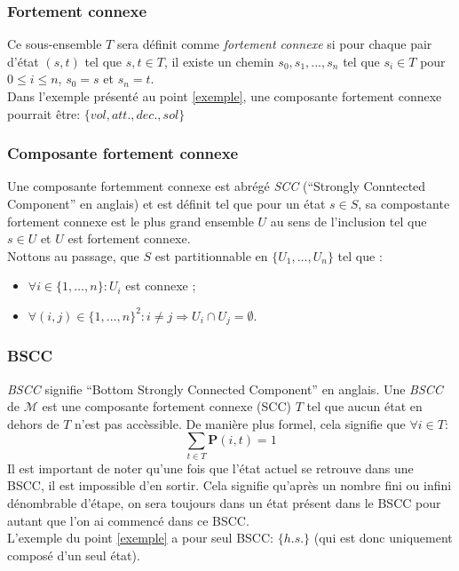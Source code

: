 \documentclass[letterpaper]{article}
\begin{document}
    \subsubsection{Fortement connexe}
      Ce sous-ensemble $T$ sera définit comme \textit{fortement connexe} si
      pour chaque pair d'état $(s, t)$ tel que $s, t \in T$, il existe un
      chemin $s_0, s_1, ..., s_n$ tel que $s_i \in T$ pour $0 \leq i \leq n$, 
      $s_0 = s$ et $s_n = t$.\\
      Dans l'exemple présenté au point \ref{exemple}, une composante fortement
      connexe pourrait être: $\{vol, att., dec., sol\}$
      
    \subsubsection{Composante fortement connexe}
      Une composante fortemment connexe est abrégé \textit{SCC} (``Strongly
      Conntected Component'' en anglais) et est définit tel que pour un état
      $s \in S$, sa compostante fortement connexe est le plus grand ensemble
      $U$ au sens de l'inclusion tel que $s \in U$ et $U$ est fortement connexe.\\
      Nottons au passage, que $S$ est partitionnable en $\{U_1, \ldots, U_n\}$ tel que :
      \begin{itemize}
	\item $\forall i \in \{1, \ldots, n\} : U_i$ est connexe ;
	\item $\forall (i, j) \in \{1, \ldots, n\}^2 : i \neq j \Rightarrow U_i \cap U_j = \emptyset$.
      \end{itemize}
      
    \subsubsection{BSCC}
      \label{bscc}
      \textit{BSCC} signifie ``Bottom Strongly Connected Component'' en anglais.
      Une \textit{BSCC} de $\mathcal{M}$ est une composante fortement connexe 
      (SCC) $T$ tel que aucun état en dehors de $T$ n'est pas accèssible.  De manière
      plus formel, cela signifie que $\forall i \in T$:
      $$\sum\limits_{t \in T} \mathbf{P}(i, t) = 1$$
      Il est important de noter qu'une fois que l'état actuel se retrouve dans une
      BSCC, il est impossible d'en sortir.  Cela signifie qu'après un nombre fini
      ou infini dénombrable d'étape, on sera toujours dans un état présent dans le BSCC
      pour autant que l'on ai commencé dans ce BSCC.\\
      L'exemple du point \ref{exemple} a pour seul BSCC: $\{h.s.\}$ (qui 
      est donc uniquement composé d'un seul état).
  
\end{document}
